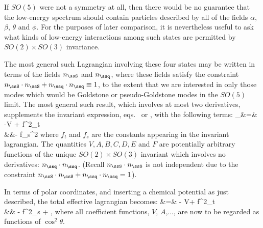 If $SO(5)$ were not a symmetry at all, then there would be
no guarantee that the low-energy spectrum should contain
particles described by all of the fields $\alpha$, $\beta$,
$\theta$ and 
$\phi$. For the purposes of later comparison, it is
nevertheless useful to ask what kinds of low-energy
interactions among such states are permitted by $SO(2)
\times SO(3)$ invariance.

The most general such Lagrangian involving these four
states may be written in terms of the fields $\ns$ and
$\nq$, where these fields satisfy the constraint $\ns\cdot
\ns + \nq \cdot \nq \equiv 1$, to the extent that we are
interested in only those modes which would be Goldstone or
pseudo-Goldstone modes in the $SO(5)$ limit. The most
general such result, which involves at most two
derivatives, supplements the invariant expression, 
eqs.~ or , with
the following terms:
%
\bg
\label{noninvform}
\Scl_\sb &=& -V + f^2_t  \nn\\
&&\qquad\qquad - f_s^2  \nn
\nd
%
where $f_t$ and $f_s$ are the constants appearing in the
invariant lagrangian. The quantities $V, A, B, C, D, E$ and
$F$ are potentially arbitrary functions of the unique $SO(2)
\times SO(3)$ invariant which involves no derivatives: $\nq
\cdot \nq$. (Recall 
$\ns \cdot \ns$ is not independent due to the constraint
$\ns\cdot 
\ns + \nq \cdot \nq = 1$). 

In terms of polar coordinates, and inserting a chemical
potential as just described, the total effective lagrangian
becomes:
%
\bg
\label{kintermangles}
\Scl &=& - V+  {f^2_t }
 \nn\\
&& \qquad \qquad - {f^2_s }  + \cdots,\nn
\nd
%
where all coefficient functions, $V$, $A$,...\etc, are now
to be regarded as functions of $\cos^2\theta$.

